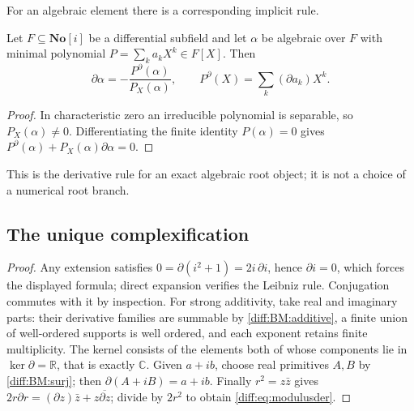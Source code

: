\documentclass[11pt,letterpaper]{article}
\numberwithin{equation}{section}
\theoremstyle{definition}
\theoremstyle{remark}
\newcommand{\No}{\mathbf{No}}
\newcommand{\SC}{\mathbf{No}[i]}
\newcommand{\R}{\mathbb R}
\newcommand{\C}{\mathbb C}
\newcommand{\der}{\partial}
\newcommand{\Ree}{\operatorname{Re}}
\newcommand{\Ker}{\operatorname{ker}}
\newcommand{\abs}[1]{\lvert#1\rvert}
\begin{document}
For an algebraic element there is a corresponding implicit rule.

\begin{proposition}
\label{diff:prop:algdiff}
Let $F\subseteq\SC$ be a differential subfield and let $\alpha$ be algebraic
over $F$ with minimal polynomial $P=\sum_{k}a_{k}X^{k}\in F[X]$. Then
\[
 \der\alpha=-\frac{P^{\der}(\alpha)}{P_{X}(\alpha)},
 \qquad P^{\der}(X)=\sum_{k}(\der a_{k})X^{k}.
\]
\end{proposition}
\begin{proof}
In characteristic zero an irreducible polynomial is separable, so
$P_{X}(\alpha)\neq0$. Differentiating the finite identity $P(\alpha)=0$ gives
$P^{\der}(\alpha)+P_{X}(\alpha)\der\alpha=0$.
\end{proof}

This is the derivative rule for an exact algebraic root object; it is not a
choice of a numerical root branch.

\subsection{The unique complexification}
\label{diff:sub:complexification}

\begin{proof}
Any extension satisfies $0=\der(i^{2}+1)=2i\,\der i$, hence $\der i=0$, which
forces the displayed formula; direct expansion verifies the Leibniz rule.
Conjugation commutes with it by inspection. For strong additivity, take real
and imaginary parts: their derivative families are summable by
\ref{diff:BM:additive}, a finite union of well-ordered supports is well
ordered, and each exponent retains finite multiplicity. The kernel consists of
the elements both of whose components lie in $\Ker\der=\R$, that is exactly
$\C$. Given $a+ib$, choose real primitives $A,B$ by \ref{diff:BM:surj}; then
$\der(A+iB)=a+ib$. Finally $r^{2}=z\bar z$ gives
$2r\der r=(\der z)\bar z+z\overline{\der z}$; divide by $2r^{2}$ to obtain
\cref{diff:eq:modulusder}.
\end{proof}
\end{document}
